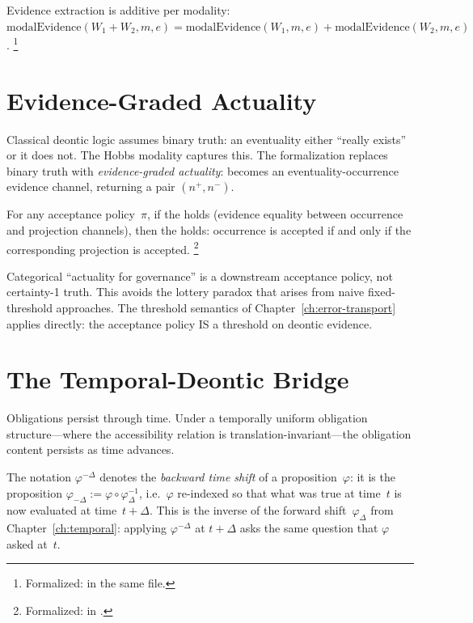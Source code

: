 \documentclass[11pt,openany]{report}
\begin{document}
\noindent
Evidence extraction is additive per modality:
$\mathrm{modalEvidence}(W_1 + W_2, m, e) =
\mathrm{modalEvidence}(W_1, m, e) +
\mathrm{modalEvidence}(W_2, m, e)$.%
\footnote{Formalized:  in the same file.}


\section{Evidence-Graded Actuality}

Classical deontic logic assumes binary truth: an eventuality either
``really exists'' or it does not.  The Hobbs  modality
captures this.  The formalization replaces binary truth with
\emph{evidence-graded actuality}:  becomes an
eventuality-occurrence evidence channel, returning a
 pair $(n^+, n^-)$.

\begin{theorem}
\label{thm:acceptance-bridge}
For any acceptance policy~$\pi$, if the  holds
(evidence equality between occurrence and projection channels),
then the  holds: occurrence is accepted
if and only if the corresponding projection is accepted.%
\footnote{Formalized:
 in
.}
\end{theorem}

\noindent
Categorical ``actuality for governance'' is a downstream acceptance
policy, not certainty-1 truth.  This avoids the lottery paradox that
arises from naive fixed-threshold approaches.  The threshold
semantics of Chapter~\ref{ch:error-transport} applies directly:
the acceptance policy IS a threshold on deontic evidence.


\section{The Temporal-Deontic Bridge}

Obligations persist through time.  Under a temporally uniform
obligation structure---where the accessibility relation is
translation-invariant---the obligation content persists as time
advances.

The notation $\varphi^{-\Delta}$ denotes the \emph{backward time
shift} of a proposition~$\varphi$: it is the proposition
$\varphi_{-\Delta} := \varphi \circ \varphi_\Delta^{-1}$, i.e.\
$\varphi$ re-indexed so that what was true at time~$t$ is now
evaluated at time~$t + \Delta$.  This is the inverse of the forward
shift~$\varphi_\Delta$ from Chapter~\ref{ch:temporal}:
applying $\varphi^{-\Delta}$ at $t + \Delta$ asks the same question
that $\varphi$ asked at~$t$.
\end{document}
